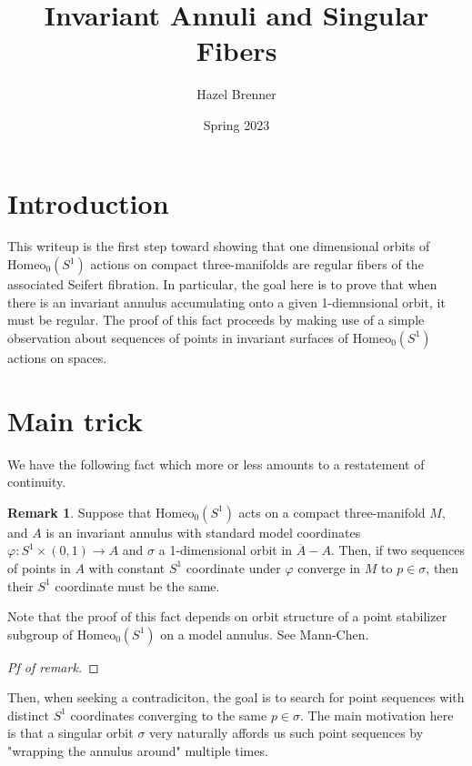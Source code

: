 \documentclass[10pt, oneside]{article}
\title{Invariant Annuli and Singular Fibers}
\author{Hazel Brenner}
\date{Spring 2023}
\newcommand{\homeoS}{\text{Homeo}_0(S^1)}
\newcommand{\cl}[1]{\overline{#1}}
\theoremstyle{definition}
\newtheorem{rem}{Remark}
\theoremstyle{definition}
\begin{document}
\maketitle

\section{Introduction}

This writeup is the first step toward showing that one dimensional orbits of $\homeoS$ actions on compact three-manifolds are regular fibers of the associated Seifert fibration. In particular, the goal here is to prove that when there is an invariant annulus accumulating onto a given 1-diemnsional orbit, it must be regular. The proof of this fact proceeds by making use of a simple observation about sequences of points in invariant surfaces of $\homeoS$ actions on spaces. 

\section{Main trick}
We have the following fact which more or less amounts to a restatement of continuity.

\begin{rem}
    Suppose that $\homeoS$ acts on a compact three-manifold $M$, and $A$ is an invariant annulus with standard model coordinates $\varphi: S^1\times (0,1) \to A$ and $\sigma$ a 1-dimensional orbit in $\cl{A}- A$. Then, if two sequences of points in $A$ with constant $S^1$ coordinate under $\varphi$ converge in $M$ to $p\in\sigma$, then their $S^1$ coordinate must be the same.
\end{rem}

Note that the proof of this fact depends on orbit structure of a point stabilizer subgroup of $\homeoS$ on a model annulus. See Mann-Chen.

\begin{proof}[Pf of remark]
\end{proof}

Then, when seeking a contradiciton, the goal is to search for point sequences with distinct $S^1$ coordinates converging to the same $p\in\sigma$. The main motivation here is that a singular orbit $\sigma$ very naturally affords us such point sequences by "wrapping the annulus around" multiple times.
\end{document}
